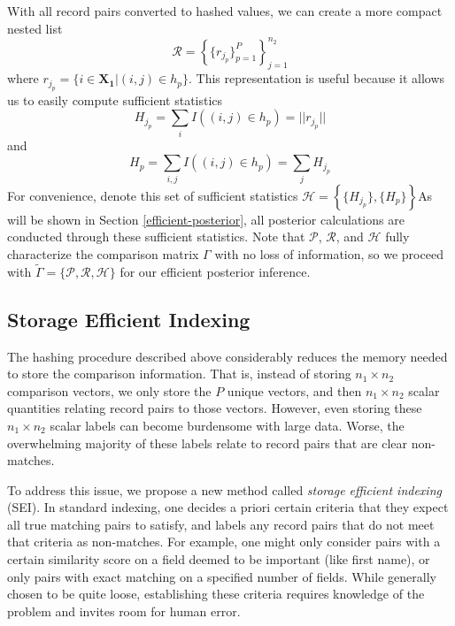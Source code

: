 \documentclass[12pt,letterpaper]{article}
\newcommand{\1}[1]{\mathbb{I}\!\left[#1\right]} %
\begin{document}
With all record pairs converted to hashed values, we can create a more compact nested list 
$$\mathcal{R} = \left\{\{r_{j_p} \}_{p=1}^{P} \right\}_{j = 1}^{n_2}$$
where $r_{j_p} = \{i \in \bm{X_1} | (i, j) \in h_p\}$. This representation is useful because it allows us to easily compute sufficient statistics
$$H_{j_p} = \sum_{i} I((i, j) \in h_p) = ||r_{j_p}||$$
and
$$H_p =  \sum_{i, j} I((i, j) \in h_p) = \sum_{j} H_{j_p}$$
For convenience, denote this set of sufficient statistics $\mathcal{H} = \left\{\{H_{j_p}\}, \{H_{p}\}\right\}$As will be shown in Section \ref{efficient-posterior}, all posterior calculations are conducted through these sufficient statistics. Note that $\mathcal{P}$, $\mathcal{R}$, and $\mathcal{H}$  fully characterize the comparison matrix $\Gamma$ with no loss of information, so we proceed with $\tilde{\Gamma} = \{\mathcal{P}, \mathcal{R}, \mathcal{H}\}$ for our efficient posterior inference. 

\hypertarget{SEI}{%
	\subsection{Storage Efficient Indexing}\label{SEI}}

The hashing procedure described above considerably reduces the memory
needed to store the comparison information. That is, instead of storing
\(n_1 \times n_2\) comparison vectors, we only store the
\(P\) unique vectors, and then \(n_1 \times n_2\) scalar quantities
relating record pairs to those vectors. However, even storing these
\(n_1 \times n_2\) scalar labels can become burdensome with large data.
Worse, the overwhelming majority of these labels relate to record pairs
that are clear non-matches.

To address this issue, we propose a new method called \emph{storage	efficient indexing} (SEI). In standard indexing, one decides a priori certain criteria that they expect all true matching pairs to satisfy, 
and labels any record pairs that do not meet that criteria as
non-matches. For example, one might only consider pairs with a certain
similarity score on a field deemed to be important (like first name), or
only pairs with exact matching on a specified number of fields. While
generally chosen to be quite loose, establishing these criteria
requires knowledge of the problem and invites room for human error. 
\end{document}
